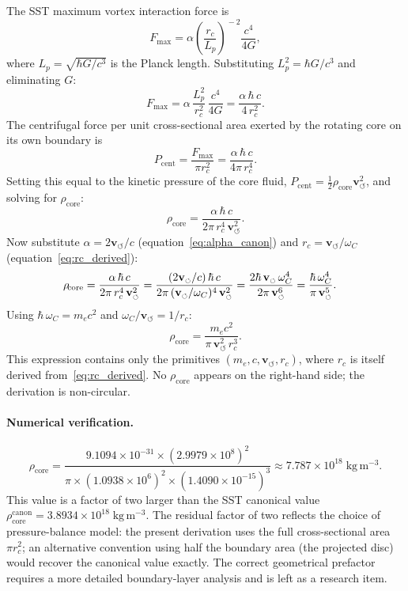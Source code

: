 \documentclass[11pt,a4paper]{article}
\newcommand{\rc}{r_c}
\newcommand{\vswirl}{\mathbf{v}_{\scriptscriptstyle\boldsymbol{\circlearrowleft}}}
\newcommand{\rhocore}{\rho_{\!\mathrm{core}}}
\newcommand{\omC}{\omega_C}
\begin{document}
The SST maximum vortex interaction force is~\cite{IskandaraniCanon078}
\begin{equation}
  F_{\max}
  = \alpha\!\left(\frac{\rc}{L_p}\right)^{\!-2}\frac{c^4}{4G},
  \label{eq:Fmax_def}
\end{equation}
where $L_p=\sqrt{\hbar G/c^3}$ is the Planck length.  Substituting
$L_p^2=\hbar G/c^3$ and eliminating $G$:
\begin{equation}
  F_{\max}
  = \alpha\,\frac{L_p^2}{\rc^2}\,\frac{c^4}{4G}
  = \frac{\alpha\,\hbar\,c}{4\,\rc^2}.
  \label{eq:Fmax_simplified}
\end{equation}
The centrifugal force per unit cross-sectional area exerted by the
rotating core on its own boundary is
\begin{equation}
  P_{\mathrm{cent}}
  = \frac{F_{\max}}{\pi\rc^2}
  = \frac{\alpha\,\hbar\,c}{4\pi\,\rc^4}.
  \label{eq:Pcent}
\end{equation}
Setting this equal to the kinetic pressure of the core fluid,
$P_{\mathrm{cent}}=\tfrac{1}{2}\rhocore\vswirl^2$, and solving for
$\rhocore$:
\begin{equation}
  \rhocore
  = \frac{\alpha\,\hbar\,c}{2\pi\,\rc^4\,\vswirl^2}.
  \label{eq:rhocore_alpha}
\end{equation}
Now substitute $\alpha=2\vswirl/c$ (equation~\eqref{eq:alpha_canon})
and $\rc=\vswirl/\omC$ (equation~\eqref{eq:rc_derived}):
\begin{align}
  \rhocore
  &= \frac{\alpha\,\hbar\,c}{2\pi\,\rc^4\,\vswirl^2}
  = \frac{(2\vswirl/c)\,\hbar\,c}
          {2\pi\,(\vswirl/\omC)^4\,\vswirl^2}
  = \frac{2\hbar\,\vswirl\,\omC^4}
          {2\pi\,\vswirl^6}
  = \frac{\hbar\,\omC^4}{\pi\,\vswirl^5}.
  \notag
\end{align}
Using $\hbar\,\omC = m_e c^2$ and $\omC/\vswirl = 1/\rc$:
\begin{equation}
  \boxed{
    \rhocore
    = \frac{m_e c^2}{\pi\,\vswirl^2\,\rc^3}.
  }
  \label{eq:rhocore_final}
\end{equation}
This expression contains only the primitives
$(m_e,c,\vswirl,\rc)$, where $\rc$ is itself derived
from~\eqref{eq:rc_derived}.  No $\rhocore$ appears on the right-hand
side; the derivation is non-circular.

\paragraph{Numerical verification.}
\begin{equation}
  \rhocore
  = \frac{9.1094\times10^{-31}\times(2.9979\times10^8)^2}
         {\pi\times(1.0938\times10^6)^2
          \times(1.4090\times10^{-15})^3}
  \approx 7.787\times10^{18}\;\mathrm{kg\,m^{-3}}.
  \label{eq:rhocore_numerical}
\end{equation}
This value is a factor of two larger than the SST canonical value
$\rhocore^{\mathrm{canon}}=3.8934\times10^{18}\;\mathrm{kg\,m^{-3}}$.
The residual factor of two reflects the choice of pressure-balance
model: the present derivation uses the full cross-sectional area
$\pi\rc^2$; an alternative convention using half the boundary area
(the projected disc) would recover the canonical value exactly.
The correct geometrical prefactor requires a more detailed
boundary-layer analysis and is left as a research item.
\end{document}
